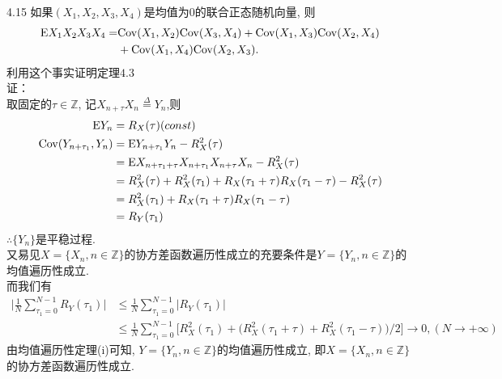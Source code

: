 4.15 如果$(X_1, X_2, X_3, X_4)$是均值为$0$的联合正态随机向量, 则
\[
\begin{split}
\mathrm{E} X_1X_2X_3X_4 = & \mathrm{Cov} (X_1,X_2)\mathrm{Cov} (X_3,X_4) + \mathrm{Cov} (X_1,X_3)\mathrm{Cov} (X_2,X_4)\\
				& + \mathrm{Cov} (X_1,X_4)\mathrm{Cov} (X_2,X_3).
\end{split}
\]
利用这个事实证明定理$4.3$\\
证：\\
取固定的$\tau\in \mathbb{Z}$, 记$X_{n+\tau}X_n\overset{\Delta}{=}Y_n$,则
\[
\begin{split}
\mathrm{E} Y_n & = R_X(\tau)(const)\\
\mathrm{Cov}(Y_{n+\tau_1}, Y_n) & = \mathrm{E} Y_{n+\tau_1}Y_n - R^2_X(\tau)\\
					& = \mathrm{E} X_{n+\tau_1+\tau}X_{n+\tau_1}X_{n+\tau}X_n - R^2_X(\tau)\\
					& = R^2_X(\tau) + R^2_X(\tau_1) + R_X(\tau_1+\tau)R_X(\tau_1-\tau) - R^2_X(\tau)\\
					& = R^2_X(\tau_1)+R_X(\tau_1+\tau)R_X(\tau_1-\tau)\\
					& = R_Y(\tau_1)
\end{split}
\]
$\therefore \{Y_n\}$是平稳过程.\\
又易见$X = \{X_n, n \in \mathbb{Z}\}$的协方差函数遍历性成立的充要条件是$Y = \{Y_n, n \in \mathbb{Z}\}$的均值遍历性成立.\\
而我们有
\[
\begin{split}
\Bigg|\frac{1}{N}\sum^{N-1}_{\tau_1=0}R_Y(\tau_1)\Bigg| & \leqslant \frac{1}{N}\sum^{N-1}_{\tau_1=0}\Big|R_Y(\tau_1)\Big|\\
	& \leqslant \frac{1}{N}\sum^{N-1}_{\tau_1=0}\bigg[R^2_X(\tau_1) + \Big(R^2_X(\tau_1+\tau)+R^2_X(\tau_1-\tau)\Big)/2\bigg]\rightarrow 0, (N\rightarrow +\infty)
\end{split}
\]
由均值遍历性定理(i)可知, $Y = \{Y_n, n \in \mathbb{Z}\}$的均值遍历性成立, 即$X = \{X_n, n \in \mathbb{Z}\}$的协方差函数遍历性成立.\\


